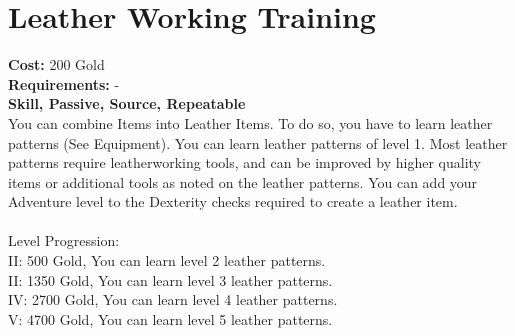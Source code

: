 \section{Leather Working Training}
\textbf{Cost:} 200 Gold\\
\textbf{Requirements:} -\\
\textbf{Skill, Passive, Source, Repeatable}\\
You can combine Items into Leather Items. To do so, you have to learn leather patterns (See Equipment). You can learn leather patterns of level 1. Most leather patterns require leatherworking tools, and can be improved by higher quality items or additional tools as noted on the leather patterns. You can add your Adventure level to the Dexterity checks required to create a leather item.\\
\\
Level Progression:\\
II: 500 Gold, You can learn level 2 leather patterns.\\
II: 1350 Gold, You can learn level 3 leather patterns.\\
IV: 2700 Gold, You can learn level 4 leather patterns.\\
V: 4700 Gold, You can learn level 5 leather patterns.\\
